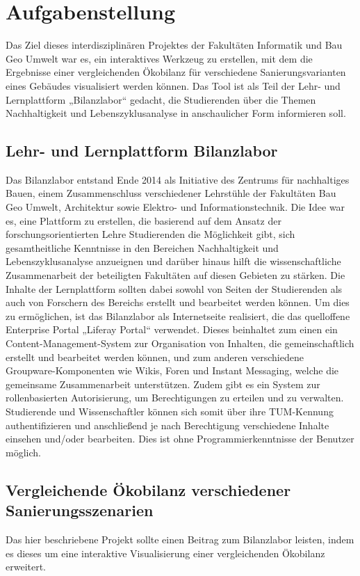 
\chapter{Aufgabenstellung}
Das Ziel dieses interdisziplinären Projektes der Fakultäten Informatik und Bau Geo Umwelt war es, ein interaktives Werkzeug zu erstellen, mit dem die Ergebnisse einer vergleichenden Ökobilanz für verschiedene Sanierungsvarianten eines Gebäudes visualisiert werden können. Das Tool ist als Teil der Lehr- und Lernplattform „Bilanzlabor“ gedacht, die Studierenden über die Themen Nachhaltigkeit und Lebenszyklusanalyse in anschaulicher Form informieren soll.
\section{Lehr- und Lernplattform Bilanzlabor}
Das Bilanzlabor entstand Ende 2014 als Initiative des Zentrums für nachhaltiges Bauen, einem Zusammenschluss verschiedener Lehrstühle der Fakultäten Bau Geo Umwelt, Architektur sowie Elektro- und Informationstechnik. Die Idee war es, eine Plattform zu erstellen, die basierend auf dem Ansatz der forschungsorientierten Lehre Studierenden die Möglichkeit gibt, sich gesamtheitliche Kenntnisse in den Bereichen Nachhaltigkeit und Lebenszyklusanalyse anzueignen und darüber hinaus hilft die wissenschaftliche Zusammenarbeit der beteiligten Fakultäten auf diesen Gebieten zu stärken. Die Inhalte der Lernplattform sollten dabei sowohl von Seiten der Studierenden als auch von Forschern des Bereichs erstellt und bearbeitet werden können. Um dies zu ermöglichen, ist das Bilanzlabor als Internetseite realisiert, die das quelloffene Enterprise Portal „Liferay Portal“ verwendet. Dieses beinhaltet zum einen ein Content-Management-System zur Organisation von Inhalten, die gemeinschaftlich erstellt und bearbeitet werden können, und zum anderen verschiedene Groupware-Komponenten wie Wikis, Foren und Instant Messaging, welche die gemeinsame Zusammenarbeit unterstützen. Zudem gibt es ein System zur rollenbasierten Autorisierung, um Berechtigungen zu erteilen und zu verwalten. Studierende und Wissenschaftler können sich somit über ihre TUM-Kennung authentifizieren und anschließend je nach Berechtigung verschiedene Inhalte einsehen und/oder bearbeiten. Dies ist ohne Programmierkenntnisse der Benutzer möglich.
\section{Vergleichende Ökobilanz verschiedener Sanierungsszenarien}
Das hier beschriebene Projekt sollte einen Beitrag zum Bilanzlabor leisten, indem es dieses um eine interaktive Visualisierung einer vergleichenden Ökobilanz erweitert. 
